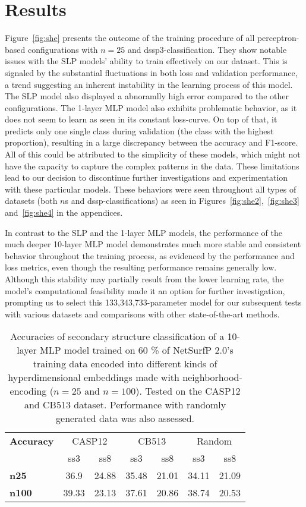 \section{Results}
Figure~\ref{fig:she} presents the outcome of the training procedure of all perceptron-based configurations with $n=25$ and dssp3-classification. They show notable issues with the SLP models' ability to train effectively on our dataset. This is signaled by the substantial fluctuations in both loss and validation performance, a trend suggesting an inherent instability in the learning process of this model. The SLP model also displayed a abnoramlly high error compared to the other configurations. The 1-layer MLP model also exhibits problematic behavior, as it does not seem to learn as seen in its constant loss-curve. On top of that, it predicts only one single class during validation (the class with the highest proportion), resulting in a large discrepancy between the accuracy and F1-score. All of this could be attributed to the simplicity of these models, which might not have the capacity to capture the complex patterns in the data. These limitations lead to our decision to discontinue further investigations and experimentation with these particular models. These behaviors were seen throughout all types of datasets (both $n$s and dssp-classifications) as seen in Figures~\ref{fig:she2},~\ref{fig:she3} and~\ref{fig:she4} in the appendices.  

In contrast to the SLP and the 1-layer MLP models, the performance of the much deeper 10-layer MLP model demonstrates much more stable and consistent behavior throughout the training process, as evidenced by the performance and loss metrics, even though the resulting performance remains generally low. Although this stability may partially result from the lower learning rate, the model's computational feasibility made it an option for further investigation, prompting us to select this 133,343,733-parameter model for our subsequent tests with various datasets and comparisons with other state-of-the-art methods.

\begin{table}[h]
    \caption{Accuracies of secondary structure classification of a 10-layer MLP model trained on 60 \% of NetSurfP 2.0's training data encoded into different kinds of hyperdimensional embeddings made with neighborhood-encoding ($n = 25$ and $n=100$). Tested on the CASP12 and CB513 dataset. Performance with randomly generated data was also assessed.}
    \label{tab:casp}
    \centering
    \begin{tabular}{l|cc|cc|cc}
        \toprule
        \textbf{Accuracy} & \multicolumn{2}{c|}{CASP12} & \multicolumn{2}{c|}{CB513} & \multicolumn{2}{c|}{Random}\\
        & ss3 & ss8 & ss3 & ss8 & ss3 & ss8\\
        \midrule
        \textbf{n25} & 36.9 & 24.88 & 35.48 & 21.01 & 34.11 & 21.09 \\
        \textbf{n100} & 39.33 & 23.13 & 37.61 & 20.86 & 38.74 & 20.53\\
        \bottomrule
    \end{tabular}
\end{table}

